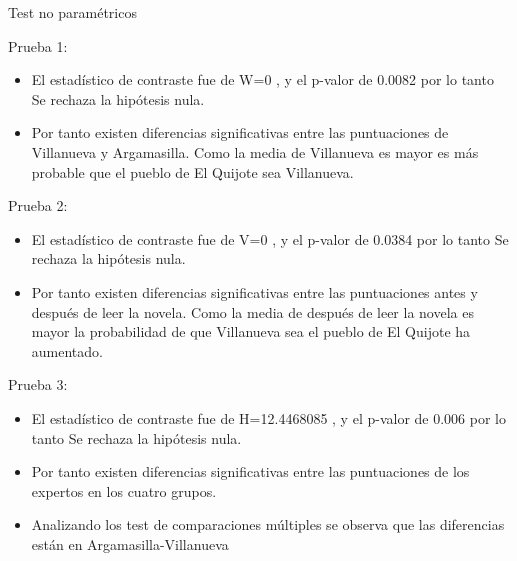 \documentclass[
  ignorenonframetext,
]{beamer}
\begin{document}
\begin{frame}
\begin{block}{Test no paramétricos}
\label{test-no-paramuxe9tricos}
\begin{block}{Prueba 1:}
\label{prueba-1}
\begin{itemize}
\item
  El estadístico de contraste fue de W=0 , y el p-valor de 0.0082 por lo
  tanto Se rechaza la hipótesis nula.
\item
  Por tanto existen diferencias significativas entre las puntuaciones de
  Villanueva y Argamasilla. Como la media de Villanueva es mayor es más
  probable que el pueblo de El Quijote sea Villanueva.
\end{itemize}
\end{block}
\end{block}
\end{frame}

\begin{frame}
\begin{block}{Prueba 2:}
\label{prueba-2}
\begin{itemize}
\item
  El estadístico de contraste fue de V=0 , y el p-valor de 0.0384 por lo
  tanto Se rechaza la hipótesis nula.
\item
  Por tanto existen diferencias significativas entre las puntuaciones
  antes y después de leer la novela. Como la media de después de leer la
  novela es mayor la probabilidad de que Villanueva sea el pueblo de El
  Quijote ha aumentado.
\end{itemize}
\end{block}
\end{frame}

\begin{frame}
\begin{block}{Prueba 3:}
\label{prueba-3}
\begin{itemize}
\item
  El estadístico de contraste fue de H=12.4468085 , y el p-valor de
  0.006 por lo tanto Se rechaza la hipótesis nula.
\item
  Por tanto existen diferencias significativas entre las puntuaciones de
  los expertos en los cuatro grupos.
\item
  Analizando los test de comparaciones múltiples se observa que las
  diferencias están en Argamasilla-Villanueva
\end{itemize}
\end{block}
\end{frame}
\end{document}
